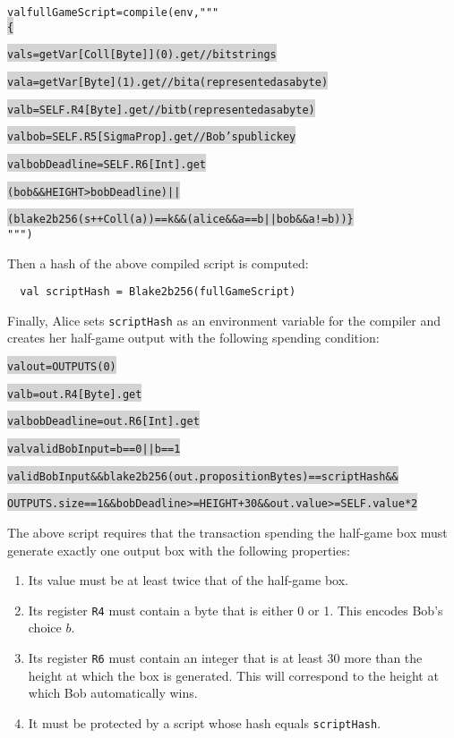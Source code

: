 \documentclass[11pt]{article}
\newcommand\Hi[2][lightgray]{%
	\hspace*{-\fboxsep}%
	\colorbox{#1}{#2}%
	\hspace*{-\fboxsep}%
}
\begin{document}
\begin{alltt}
val fullGameScript = compile(env, """ \Hi{\{}
  \Hi{val s     = getVar[Coll[Byte]](0).get // bit string s}
  \Hi{val a     = getVar[Byte](1).get       // bit a (represented as a byte)}
  \Hi{val b     = SELF.R4[Byte].get         // bit b (represented as a byte)}
  \Hi{val bob   = SELF.R5[SigmaProp].get    // Bob's public key}
  \Hi{val bobDeadline = SELF.R6[Int].get}
   
  \Hi{(bob && HEIGHT > bobDeadline) || }
  \Hi{(blake2b256(s ++ Coll(a)) == k && (alice && a == b || bob && a != b)) \}} """)
\end{alltt}

Then a hash of the above compiled script is computed:

\begin{verbatim}
  val scriptHash = Blake2b256(fullGameScript)
\end{verbatim}

Finally, Alice sets \texttt{scriptHash} as an environment variable for the compiler and creates her half-game output with the following spending condition:

\begin{alltt}
  \Hi{val out           = OUTPUTS(0)}
  \Hi{val b             = out.R4[Byte].get}
  \Hi{val bobDeadline   = out.R6[Int].get}
  \Hi{val validBobInput = b == 0 || b == 1}

  \Hi{validBobInput && blake2b256(out.propositionBytes) == scriptHash &&}
  \Hi{OUTPUTS.size == 1 && bobDeadline >= HEIGHT+30 && out.value >= SELF.value * 2 }
\end{alltt}

The above script requires that the transaction spending the half-game box must generate exactly one output box with the following properties:

\begin{enumerate}
	\item Its value must be at least twice that of the half-game box.
	\item Its register \texttt{R4} must contain a byte that is either 0 or 1. This encodes Bob's choice $b$.
	\item Its register \texttt{R6} must contain an integer that is at least 30 more than the height at which the box is generated. This will correspond to the height at which Bob automatically wins.
	\item It must be protected by a script whose hash equals \texttt{scriptHash}.
\end{enumerate}
 
\end{document}
